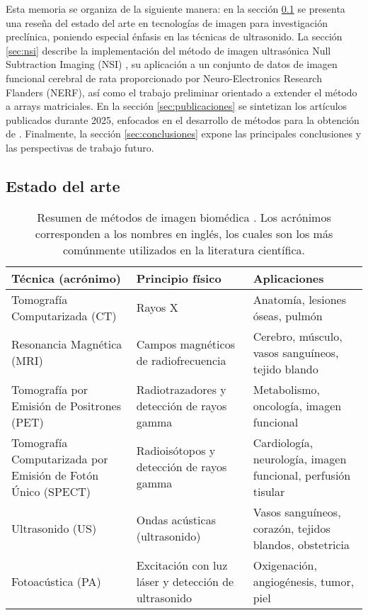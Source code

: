 \documentclass[10pt,a4paper]{article}
\begin{document}
Esta memoria se organiza de la siguiente manera: en la sección \ref{sec:estado_arte} se presenta una reseña del estado del arte en tecnologías de imagen para investigación preclínica, poniendo especial énfasis en las técnicas de ultrasonido. La sección \ref{sec:nsi} describe la implementación del método de imagen ultrasónica Null Subtraction Imaging (NSI) \cite{Agarwal2019_NSI}, su aplicación a un conjunto de datos de imagen funcional cerebral de rata proporcionado por Neuro-Electronics Research Flanders (NERF), así como el trabajo preliminar orientado a extender el método a arrays matriciales. En la sección \ref{sec:publicaciones} se sintetizan los artículos publicados durante 2025, enfocados en el desarrollo de métodos para la obtención de . Finalmente, la sección \ref{sec:conclusiones} expone las principales conclusiones y las perspectivas de trabajo futuro.



\subsection{Estado del arte}\label{sec:estado_arte}

\begin{table}[H]
	\small
	\centering
	\caption{Resumen de métodos de imagen biomédica \cite{Bushberg2021}. Los acrónimos corresponden a los nombres en inglés, los cuales son los más comúnmente utilizados en la literatura científica.} 
	\begin{tabularx}{\textwidth}{X|X|X}
		\\
		\hline
		\textbf{Técnica (acrónimo)} & \textbf{Principio físico} & \textbf{Aplicaciones} \\
		\hline\hline
		Tomografía Computarizada (CT) & Rayos X & Anatomía, lesiones óseas, pulmón \\
		\hline
		Resonancia Magnética (MRI) & Campos magnéticos de radiofrecuencia & Cerebro, músculo, vasos sanguíneos, tejido blando \\
		\hline
		Tomografía por Emisión de Positrones (PET) & Radiotrazadores y detección de rayos gamma & Metabolismo, oncología, imagen funcional \\
		\hline
		Tomografía Computarizada por Emisión de Fotón Único (SPECT) & Radioisótopos y detección de rayos gamma & Cardiología, neurología, imagen funcional, perfusión tisular \\
		\hline
		Ultrasonido (US) & Ondas acústicas (ultrasonido) & Vasos sanguíneos, corazón, tejidos blandos, obstetricia \\
		\hline
		Fotoacústica (PA) & Excitación con luz láser y detección de ultrasonido & Oxigenación, angiogénesis, tumor, piel \\
		\hline
	\end{tabularx}
	\label{tab:metodos-imagen}
\end{table}
\end{document}
